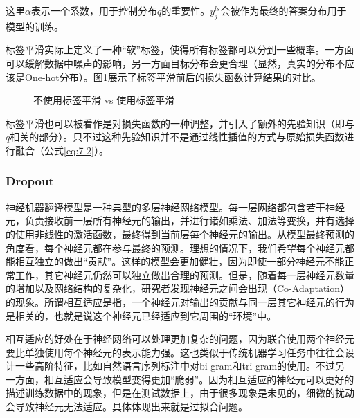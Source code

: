 \noindent 这里$\alpha$表示一个系数，用于控制分布$q$的重要性。$y_{j}^{ls}$会被作为最终的答案分布用于模型的训练。

\parinterval 标签平滑实际上定义了一种``软''标签，使得所有标签都可以分到一些概率。一方面可以缓解数据中噪声的影响，另一方面目标分布会更合理（显然，真实的分布不应该是One-hot分布）。图\ref{fig:7-12}展示了标签平滑前后的损失函数计算结果的对比。

\begin{figure}[htp]
\centering

\caption{不使用标签平滑 vs 使用标签平滑}
\label{fig:7-12}
\end{figure}

\parinterval 标签平滑也可以被看作是对损失函数的一种调整，并引入了额外的先验知识（即与$q$相关的部分）。只不过这种先验知识并不是通过线性插值的方式与原始损失函数进行融合（公式\ref{eq:7-2}）。


\subsubsection{Dropout}

\parinterval 神经机器翻译模型是一种典型的多层神经网络模型。每一层网络都包含若干神经元，负责接收前一层所有神经元的输出，并进行诸如乘法、加法等变换，并有选择的使用非线性的激活函数，最终得到当前层每个神经元的输出。从模型最终预测的角度看，每个神经元都在参与最终的预测。理想的情况下，我们希望每个神经元都能相互独立的做出``贡献''。这样的模型会更加健壮，因为即使一部分神经元不能正常工作，其它神经元仍然可以独立做出合理的预测。但是，随着每一层神经元数量的增加以及网络结构的复杂化，研究者发现神经元之间会出现{\small{}}（Co-Adaptation）的现象。所谓相互适应是指，一个神经元对输出的贡献与同一层其它神经元的行为是相关的，也就是说这个神经元已经适应到它周围的``环境''中。

\parinterval 相互适应的好处在于神经网络可以处理更加复杂的问题，因为联合使用两个神经元要比单独使用每个神经元的表示能力强。这也类似于传统机器学习任务中往往会设计一些高阶特征，比如自然语言序列标注中对bi-gram和tri-gram的使用。不过另一方面，相互适应会导致模型变得更加``脆弱''。因为相互适应的神经元可以更好的描述训练数据中的现象，但是在测试数据上，由于很多现象是未见的，细微的扰动会导致神经元无法适应。具体体现出来就是过拟合问题。

